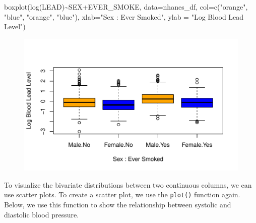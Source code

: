 \documentclass[
  letterpaper,
]{krantz}
\makeatletter
\newenvironment{Shaded}{\begin{snugshade}}{\end{snugshade}}
\newcommand{\AttributeTok}[1]{\textcolor[rgb]{0.40,0.45,0.13}{#1}}
\newcommand{\FunctionTok}[1]{\textcolor[rgb]{0.28,0.35,0.67}{#1}}
\newcommand{\NormalTok}[1]{\textcolor[rgb]{0.00,0.23,0.31}{#1}}
\newcommand{\SpecialCharTok}[1]{\textcolor[rgb]{0.37,0.37,0.37}{#1}}
\newcommand{\StringTok}[1]{\textcolor[rgb]{0.13,0.47,0.30}{#1}}
\newenvironment{kframe}{%
\medskip{}
\setlength{\fboxsep}{.8em}
 \def\at@end@of@kframe{}%
 \ifinner\ifhmode%
  \def\at@end@of@kframe{\end{minipage}}%
  \begin{minipage}{\columnwidth}%
 \fi\fi%
 \def\FrameCommand##1{\hskip\@totalleftmargin \hskip-\fboxsep
 \colorbox{shadecolor}{##1}\hskip-\fboxsep
     \hskip-\linewidth \hskip-\@totalleftmargin \hskip\columnwidth}%
 \MakeFramed {\advance\hsize-\width
   \@totalleftmargin\z@ \linewidth\hsize
   \@setminipage}}%
 {\par\unskip\endMakeFramed%
 \at@end@of@kframe}
\renewenvironment{Shaded}{\begin{kframe}}{\end{kframe}}
\makeatother
\begin{document}
\begin{Shaded}
\begin{Highlighting}[]
\FunctionTok{boxplot}\NormalTok{(}\FunctionTok{log}\NormalTok{(LEAD)}\SpecialCharTok{\textasciitilde{}}\NormalTok{SEX}\SpecialCharTok{+}\NormalTok{EVER\_SMOKE, }\AttributeTok{data=}\NormalTok{nhanes\_df, }
        \AttributeTok{col=}\FunctionTok{c}\NormalTok{(}\StringTok{"orange"}\NormalTok{, }\StringTok{"blue"}\NormalTok{, }\StringTok{"orange"}\NormalTok{, }\StringTok{"blue"}\NormalTok{),}
        \AttributeTok{xlab=}\StringTok{"Sex : Ever Smoked"}\NormalTok{, }\AttributeTok{ylab =} \StringTok{"Log Blood Lead Level"}\NormalTok{)}
\end{Highlighting}
\end{Shaded}

\begin{figure}[H]

{\centering \includegraphics[width=1\textwidth,height=\textheight]{book/4_exploratory_analysis_files/figure-pdf/unnamed-chunk-16-1.pdf}

}

\end{figure}

To visualize the bivariate distributions between two continuous columns,
we can use scatter plots. To create a scatter plot, we use the
\texttt{plot()} function again. Below, we use this function to show the
relationship between systolic and diastolic blood pressure.

\begin{Shaded}
\end{Shaded}
\end{document}
